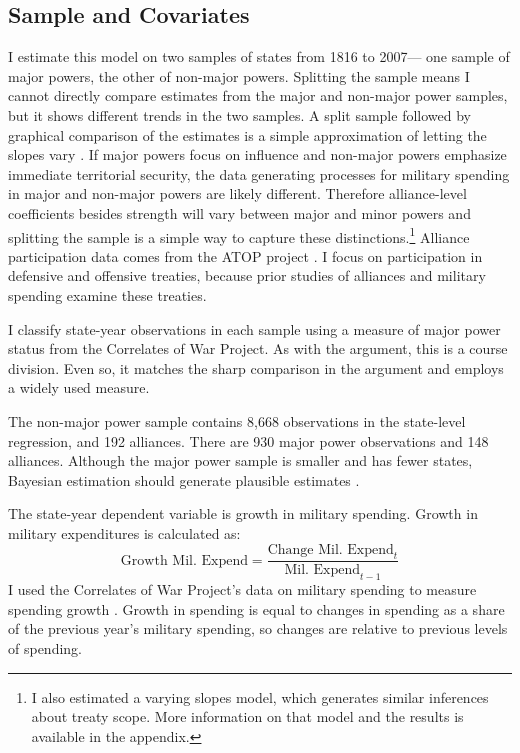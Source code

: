 \documentclass[12pt]{article}
\begin{document}
\subsection{Sample and Covariates} 

I estimate this model on two samples of states from 1816 to 2007--- one sample of major powers, the other of non-major powers. 
Splitting the sample means I cannot directly compare estimates from the major and non-major power samples, but it shows different trends in the two samples. 
A split sample followed by graphical comparison of the estimates is a simple approximation of letting the slopes vary \citep{GelmanHill2007}. 
If major powers focus on influence and non-major powers emphasize immediate territorial security, the data generating processes for military spending in major and non-major powers are likely different.
Therefore alliance-level coefficients besides strength will vary between major and minor powers and splitting the sample is a simple way to capture these distinctions.\footnote{I also estimated a varying slopes model, which generates similar inferences about treaty scope. More information on that model and the results is available in the appendix.} 
Alliance participation data comes from the ATOP project \citep{Leedsetal2002}. 
I focus on participation in defensive and offensive treaties, because prior studies of alliances and military spending examine these treaties. 


I classify state-year observations in each sample using a measure of major power status from the Correlates of War Project. 
As with the argument, this is a course division. 
Even so, it matches the sharp comparison in the argument and employs a widely used measure. 


The non-major power sample contains 8,668 observations in the state-level regression, and 192 alliances. 
There are 930 major power observations and 148 alliances. 
Although the major power sample is smaller and has fewer states, Bayesian estimation should generate plausible estimates \citep{Stegmueller2013}. 


The state-year dependent variable is growth in military spending.
Growth in military expenditures is calculated as:
\begin{equation}
\mbox{Growth Mil. Expend} = \frac{ \mbox{Change Mil. Expend}_t }{ \mbox{Mil. Expend}_{t-1} }
\end{equation} 
I used the Correlates of War Project's data on military spending to measure spending growth \citep{SingerCINC1988}. 
Growth in spending is equal to changes in spending as a share of the previous year's military spending, so changes are relative to previous levels of spending. 
\end{document}
